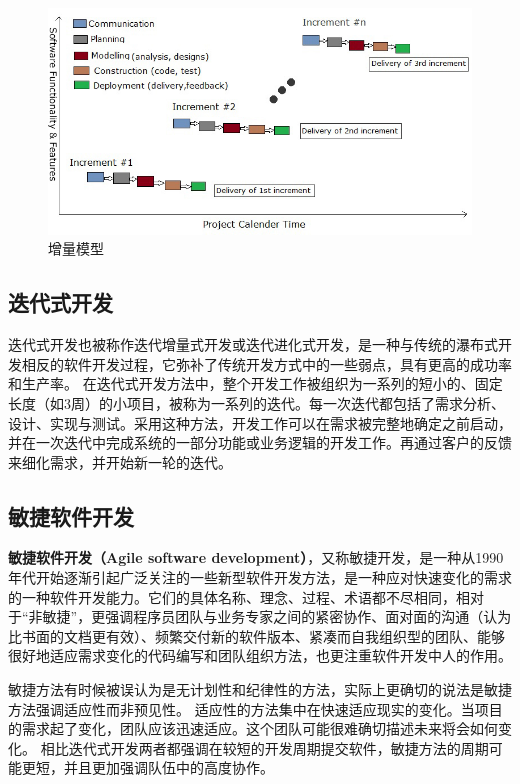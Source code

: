 \begin{figure}[ht]
	\begin{center}
		\includegraphics[keepaspectratio,width=0.5\paperwidth]{Pictures/IncrementalModel.jpg}
	\caption{增量模型}
	\label{fig:processmemlayout}
	\end{center}
\end{figure}

\subsection{迭代式开发}
迭代式开发也被称作迭代增量式开发或迭代进化式开发，是一种与传统的瀑布式开发相反的软件开发过程，它弥补了传统开发方式中的一些弱点，具有更高的成功率和生产率。
在迭代式开发方法中，整个开发工作被组织为一系列的短小的、固定长度（如3周）的小项目，被称为一系列的迭代。每一次迭代都包括了需求分析、设计、实现与测试。采用这种方法，开发工作可以在需求被完整地确定之前启动，并在一次迭代中完成系统的一部分功能或业务逻辑的开发工作。再通过客户的反馈来细化需求，并开始新一轮的迭代。

\subsection{敏捷软件开发}
\textbf{敏捷软件开发（Agile software development）}，又称敏捷开发，是一种从1990年代开始逐渐引起广泛关注的一些新型软件开发方法，是一种应对快速变化的需求的一种软件开发能力。它们的具体名称、理念、过程、术语都不尽相同，相对于“非敏捷”，更强调程序员团队与业务专家之间的紧密协作、面对面的沟通（认为比书面的文档更有效）、频繁交付新的软件版本、紧凑而自我组织型的团队、能够很好地适应需求变化的代码编写和团队组织方法，也更注重软件开发中人的作用。

敏捷方法有时候被误认为是无计划性和纪律性的方法，实际上更确切的说法是敏捷方法强调适应性而非预见性。
适应性的方法集中在快速适应现实的变化。当项目的需求起了变化，团队应该迅速适应。这个团队可能很难确切描述未来将会如何变化。
相比迭代式开发两者都强调在较短的开发周期提交软件，敏捷方法的周期可能更短，并且更加强调队伍中的高度协作。


